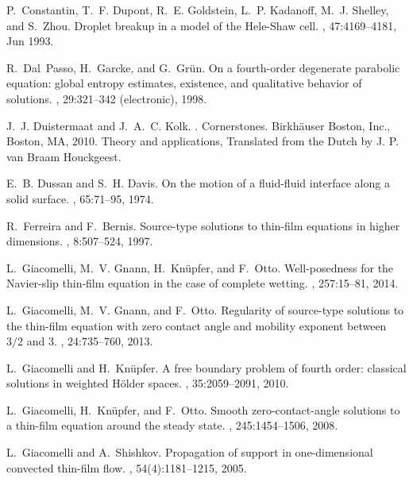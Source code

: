 \documentclass{article}%
\begin{document}
{\begin{thebibliography}{10}
P.~Constantin, T.~F. Dupont, R.~E. Goldstein, L.~P. Kadanoff, M.~J. Shelley,
  and S.~Zhou.
\newblock Droplet breakup in a model of the {H}ele-{S}haw cell.
, 47:4169--4181, Jun 1993.

R.~Dal~Passo, H.~Garcke, and G.~Gr{\"u}n.
\newblock On a fourth-order degenerate parabolic equation: global entropy
  estimates, existence, and qualitative behavior of solutions.
, 29:321--342 (electronic), 1998.

J.~J. Duistermaat and J.~A.~C. Kolk.
.
\newblock Cornerstones. Birkh\"auser Boston, Inc., Boston, MA, 2010.
\newblock Theory and applications, Translated from the Dutch by J. P. van Braam
  Houckgeest.

E.~B. Dussan and S.~H. Davis.
\newblock On the motion of a fluid-fluid interface along a solid surface.
, 65:71--95, 1974.

R.~Ferreira and F.~Bernis.
\newblock Source-type solutions to thin-film equations in higher dimensions.
, 8:507--524, 1997.

L.~Giacomelli, M.~V. Gnann, H.~Kn{\"u}pfer, and F.~Otto.
\newblock Well-posedness for the {N}avier-slip thin-film equation in the case
  of complete wetting.
, 257:15--81, 2014.

L.~Giacomelli, M.~V. Gnann, and F.~Otto.
\newblock Regularity of source-type solutions to the thin-film equation with
  zero contact angle and mobility exponent between {$3/2$} and 3.
, 24:735--760, 2013.

L.~Giacomelli and H.~Kn{\"u}pfer.
\newblock A free boundary problem of fourth order: classical solutions in
  weighted {H}\"older spaces.
, 35:2059--2091, 2010.

L.~Giacomelli, H.~Kn{\"u}pfer, and F.~Otto.
\newblock Smooth zero-contact-angle solutions to a thin-film equation around
  the steady state.
, 245:1454--1506, 2008.

L.~Giacomelli and A.~Shishkov.
\newblock Propagation of support in one-dimensional convected thin-film flow.
, 54(4):1181--1215, 2005.


\end{thebibliography}}
\end{document}
